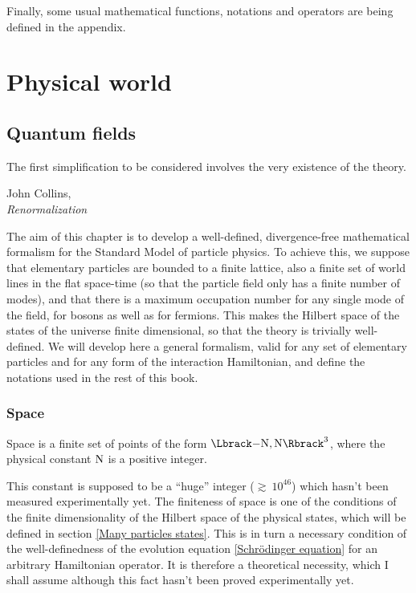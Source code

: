 \documentclass[10pt,a4paper,twoside,openany]{book}
\begin{document}
Finally, some usual mathematical functions, notations and operators are being defined in the appendix.

\mainmatter

\part{Physical world}

\chapter{Quantum fields}
\label{Quantum fields}

\renewcommand{\epigraphwidth}{7cm}
\epigraph{The first simplification to be considered involves the very existence of the theory.}{John Collins,\\\textit{Renormalization}~\cite{Collins1984}}

The aim of this chapter is to develop a well-defined, divergence-free mathematical formalism for the Standard Model of particle physics. To achieve this, we suppose that elementary particles are bounded to a finite lattice, also a finite set of world lines in the flat space-time (so that the particle field only has a finite number of modes), and that there is a maximum occupation number for any single mode of the field, for bosons as well as for fermions. This makes the Hilbert space of the states of the universe finite dimensional, so that the theory is trivially well-defined. We will develop here a general formalism, valid for any set of elementary particles and for any form of the interaction Hamiltonian, and define the notations used in the rest of this book.

\section{Space}

 Space is a finite set of points of the form $\FL$, where the physical constant $\mathrm N$ is a positive integer.

 This constant is supposed to be a ``huge'' integer ($\gtrsim~10^{46}$) which hasn't been measured experimentally yet. The finiteness of space is one of the conditions of the finite dimensionality of the Hilbert space of the physical states, which will be defined in section \ref{Many particles states}. This is in turn a necessary condition of the well-definedness of the evolution equation \ref{Schrödinger equation} for an arbitrary Hamiltonian operator. It is therefore a theoretical necessity, which I shall assume although this fact hasn't been proved experimentally yet.
\end{document}
